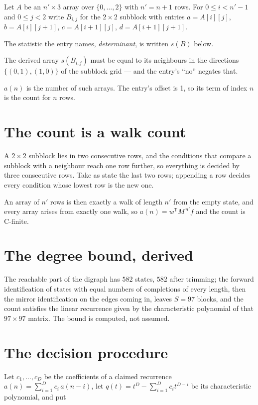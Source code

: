 \documentclass[11pt]{article}
\theoremstyle{definition}
\begin{document}
Let $A$ be an $n' \times 3$ array over $\{0,\dots,2\}$ with $n' = n + 1$ rows. For $0 \le i < n'-1$ and $0 \le j < 2$ write $B_{i,j}$ for the $2\times2$ subblock with entries $a = A[i][j]$, $b = A[i][j{+}1]$, $c = A[i{+}1][j]$, $d = A[i{+}1][j{+}1]$.

The statistic the entry names, {\itshape determinant}, is written $s(B)$ below.

The derived array $s(B_{i,j})$ must be equal to its neighbours in the directions $\{(0,1), (1,0)\}$ of the subblock grid --- and the entry's ``no'' negates that.

$a(n)$ is the number of such arrays. The entry's offset is 1, so its term of index $n$ is the count for $n$ rows.

\section{The count is a walk count}

A $2\times2$ subblock lies in two consecutive rows, and the conditions that compare a subblock with a neighbour reach one row further, so everything is decided by three consecutive rows. Take as state the last two rows; appending a row decides every condition whose lowest row is the new one.

An array of $n'$ rows is then exactly a walk of length $n'$ from the empty state, and every array arises from exactly one walk, so $a(n) = w^{\mathsf T}M^{\,n'}f$ and the count is C-finite.

\section{The degree bound, derived}

The reachable part of the digraph has $582$ states, $582$ after trimming; the forward identification of states with equal numbers of completions of every length, then the mirror identification on the edges coming in, leaves $S = 97$ blocks, and the count satisfies the linear recurrence given by the characteristic polynomial of that $97\times97$ matrix. The bound is computed, not assumed.

\section{The decision procedure}

Let $c_1,\dots,c_D$ be the coefficients of a claimed recurrence $a(n) = \sum_{i=1}^{D} c_i\,a(n-i)$, let $q(t) = t^{D} - \sum_{i=1}^{D} c_i t^{D-i}$ be its characteristic polynomial, and put
\end{document}
